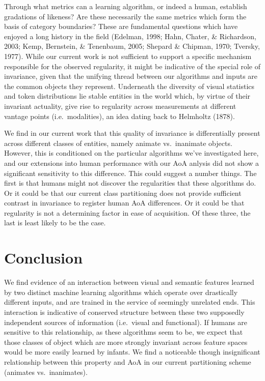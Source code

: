 \documentclass[10pt, letterpaper]{article}
\begin{document}
Through what metrics can a learning algorithm, or indeed a human,
establish gradations of likeness? Are these necessarily the same metrics
which form the basis of category boundaries? These are fundamental
questions which have enjoyed a long history in the field (Edelman, 1998;
Hahn, Chater, \& Richardson, 2003; Kemp, Bernstein, \& Tenenbaum, 2005;
Shepard \& Chipman, 1970; Tversky, 1977). While our current work is not
sufficient to support a specific mechanism responsible for the observed
regularity, it might be indicative of the special role of invariance,
given that the unifying thread between our algorithms and inputs are the
common objects they represent. Underneath the diversity of visual
statistics and token distributions lie stable entities in the world
which, by virtue of their invariant actuality, give rise to regularity
across measurements at different vantage points (i.e.~modalities), an
idea dating back to Helmholtz (1878).

We find in our current work that this quality of invariance is
differentially present across different classes of entities, namely
animate vs.~inanimate objects. However, this is conditioned on the
particular algorithms we've investigated here, and our extensions into
human performance with our AoA anlysis did not show a significant
sensitivity to this difference. This could suggest a number things. The
first is that humans might not discover the regularities that these
algorithms do. Or it could be that our current class partitioning does
not provide sufficient contrast in invariance to register human AoA
differences. Or it could be that regularity is not a determining factor
in ease of acquisition. Of these three, the last is least likely to be
the case.

\section{Conclusion}\label{conclusion}

We find evidence of an interaction between visual and semantic features
learned by two distinct machine learning algorithms which operate over
drastically different inputs, and are trained in the service of
seemingly unrelated ends. This interaction is indicative of conserved
structure between these two supposedly independent sources of
information (i.e.~visual and functional). If humans are sensitive to
this relationship, as these algorithms seem to be, we expect that those
classes of object which are more strongly invariant across feature
spaces would be more easily learned by infants. We find a noticeable
though insignificant relationship between this property and AoA in our
current partitioning scheme (animates vs.~inanimates).
\end{document}
